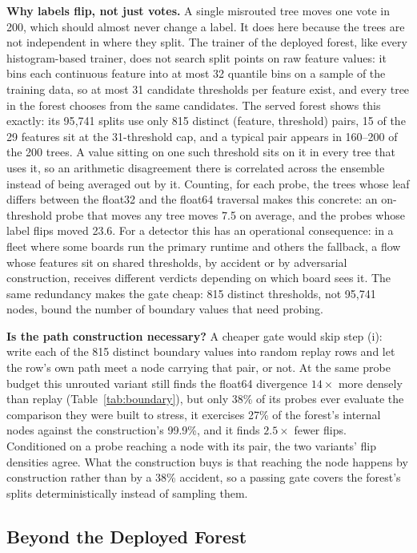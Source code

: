 \documentclass[runningheads]{llncs}
\begin{document}
\textbf{Why labels flip, not just votes.} A single misrouted tree moves one vote in 200, which should almost never change a label. It does here because the trees are not independent in where they split. The trainer of the deployed forest, like every histogram-based trainer, does not search split points on raw feature values: it bins each continuous feature into at most 32 quantile bins on a sample of the training data, so at most 31 candidate thresholds per feature exist, and every tree in the forest chooses from the same candidates. The served forest shows this exactly: its 95{,}741 splits use only 815 distinct (feature, threshold) pairs, 15 of the 29 features sit at the 31-threshold cap, and a typical pair appears in 160--200 of the 200 trees. A value sitting on one such threshold sits on it in every tree that uses it, so an arithmetic disagreement there is correlated across the ensemble instead of being averaged out by it. Counting, for each probe, the trees whose leaf differs between the float32 and the float64 traversal makes this concrete: an on-threshold probe that moves any tree moves 7.5 on average, and the probes whose label flips moved 23.6. For a detector this has an operational consequence: in a fleet where some boards run the primary runtime and others the fallback, a flow whose features sit on shared thresholds, by accident or by adversarial construction, receives different verdicts depending on which board sees it. The same redundancy makes the gate cheap: 815 distinct thresholds, not 95{,}741 nodes, bound the number of boundary values that need probing.

\textbf{Is the path construction necessary?} A cheaper gate would skip step (i): write each of the 815 distinct boundary values into random replay rows and let the row's own path meet a node carrying that pair, or not. At the same probe budget this unrouted variant still finds the float64 divergence $14\times$ more densely than replay (Table~\ref{tab:boundary}), but only 38\% of its probes ever evaluate the comparison they were built to stress, it exercises 27\% of the forest's internal nodes against the construction's 99.9\%, and it finds $2.5\times$ fewer flips. Conditioned on a probe reaching a node with its pair, the two variants' flip densities agree. What the construction buys is that reaching the node happens by construction rather than by a 38\% accident, so a passing gate covers the forest's splits deterministically instead of sampling them.

\subsection{Beyond the Deployed Forest}
\label{sec:generalize}
\end{document}
